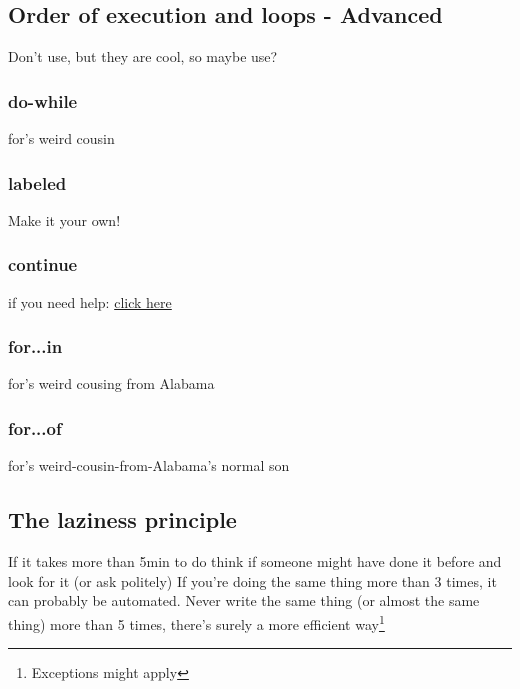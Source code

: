 \subsection{Order of execution and loops - Advanced}
\label{sub:execAdv}
Don't use, but they are cool, so maybe use?
    \subsubsection{do-while}
    \label{subsub:doWhile}
for's weird cousin

    \subsubsection{labeled}
    \label{subsub:labeled}
Make it your own!

    \subsubsection{continue}
    \label{subsub:continue}
if you need help: \href{http://letmegooglethat.com/?q=continue}{click here}

    \subsubsection{for...in}
    \label{subsub:forIn}
for's weird cousing from Alabama

    \subsubsection{for...of}
    \label{subsub:forOf}
for's weird-cousin-from-Alabama's normal son
    
\subsection{The laziness principle}
\label{sub:lazy}
If it takes more than 5min to do think if someone might have done it before and look for it (or ask politely)
If you're doing the same thing more than 3 times, it can probably be automated. Never write the same thing (or almost the same thing) more than 5 times, there's surely a more efficient way\footnote{Exceptions might apply}
